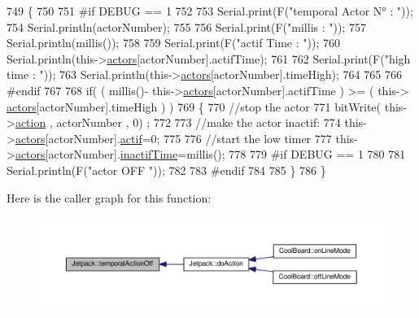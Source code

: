 \begin{DoxyCode}
749 \{
750 
751 \textcolor{preprocessor}{#if DEBUG == 1}
752     
753     Serial.print(F(\textcolor{stringliteral}{"temporal Actor N° : "}));
754     Serial.println(actorNumber);
755 
756     Serial.print(F(\textcolor{stringliteral}{"millis : "}));
757     Serial.println(millis());
758 
759     Serial.print(F(\textcolor{stringliteral}{"actif Time : "}));
760     Serial.println(this->\hyperlink{class_jetpack_a7e16d2f97837f9712a2e6de1c50d99db}{actors}[actorNumber].actifTime);
761 
762     Serial.print(F(\textcolor{stringliteral}{"high time : "}));
763     Serial.println(this->\hyperlink{class_jetpack_a7e16d2f97837f9712a2e6de1c50d99db}{actors}[actorNumber].timeHigh);
764 
765 
766 \textcolor{preprocessor}{#endif}
767     
768     \textcolor{keywordflow}{if}( ( millis()- this->\hyperlink{class_jetpack_a7e16d2f97837f9712a2e6de1c50d99db}{actors}[actorNumber].actifTime  ) >= (  this->
      \hyperlink{class_jetpack_a7e16d2f97837f9712a2e6de1c50d99db}{actors}[actorNumber].timeHigh  ) )
769     \{
770         \textcolor{comment}{//stop the actor}
771         bitWrite( this->\hyperlink{class_jetpack_aca3142925a7b0834b34ae91d26af7765}{action} , actorNumber , 0) ;
772 
773         \textcolor{comment}{//make the actor inactif:}
774         this->\hyperlink{class_jetpack_a7e16d2f97837f9712a2e6de1c50d99db}{actors}[actorNumber].\hyperlink{struct_jetpack_1_1state_aa177541689bbaea21a4650a083b0df77}{actif}=0;
775 
776         \textcolor{comment}{//start the low timer}
777         this->\hyperlink{class_jetpack_a7e16d2f97837f9712a2e6de1c50d99db}{actors}[actorNumber].\hyperlink{struct_jetpack_1_1state_aaf817b1f9e7a4d65b9e3ca4726b281f6}{inactifTime}=millis();
778 
779 \textcolor{preprocessor}{    #if DEBUG == 1 }
780 
781         Serial.println(F(\textcolor{stringliteral}{"actor OFF "}));
782     
783 \textcolor{preprocessor}{    #endif}
784                 
785     \}   
786 \}
\end{DoxyCode}
Here is the caller graph for this function\+:\nopagebreak
\begin{figure}[H]
\begin{center}
\leavevmode
\includegraphics[width=350pt]{df/d1d/class_jetpack_a2991b302cd99bf89325f9b66b104d575_icgraph}
\end{center}
\end{figure}
\mbox{\label{class_jetpack_ad011d904f639accb5f94ef806846ef59}} 
